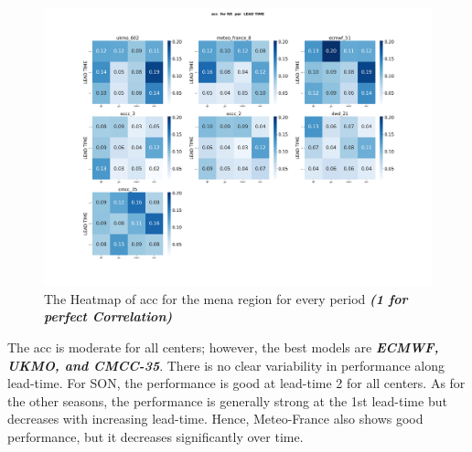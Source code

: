 \begin{figure}[H]
	\centering
	\includegraphics[scale=0.25]{plots/det/acc/acc_RR_mena.png}
	\caption{The Heatmap of acc for the mena region for every period \textbf{\textit{(1 for perfect Correlation)} }}
\end{figure}
The acc is moderate for all centers; however, the best models are \textbf{\textit{ECMWF, UKMO, and CMCC-35}}. There is no clear variability in performance along lead-time. For SON, the performance is good at lead-time 2 for all centers. As for the other seasons, the performance is generally strong at the 1st lead-time but decreases with increasing lead-time.
Hence, Meteo-France also shows good performance, but it decreases significantly over time.



